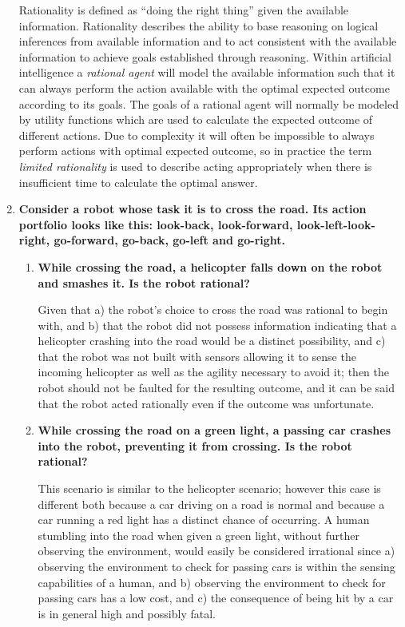 \begin{enumerate}
Rationality is defined as ``doing the right thing'' given the available information. Rationality describes the ability to base reasoning on logical inferences from available information and to act consistent with the available information to achieve goals established through reasoning. Within artificial intelligence a \textit{rational agent} will model the available information such that it can always perform the action available with the optimal expected outcome according to its goals. The goals of a rational agent will normally be modeled by utility functions which are used to calculate the expected outcome of different actions. Due to complexity it will often be impossible to always perform actions with optimal expected outcome, so in practice the term \textit{limited rationality} is used to describe acting appropriately when there is insufficient time to calculate the optimal answer.

\item \textbf{Consider a robot whose task it is to cross the road. Its action portfolio looks like this: look-back, look-forward, look-left-look-right, go-forward, go-back, go-left and go-right.}

\begin{enumerate}

\item \textbf{While crossing the road, a helicopter falls down on the robot and smashes it. Is the robot rational?}

Given that a) the robot's choice to cross the road was rational to begin with, and b) that the robot did not possess information indicating that a helicopter crashing into the road would be a distinct possibility, and c) that the robot was not built with sensors allowing it to sense the incoming helicopter as well as the agility necessary to avoid it; then the robot should not be faulted for the resulting outcome, and it can be said that the robot acted rationally even if the outcome was unfortunate. 

\item \textbf{While crossing the road on a green light, a passing car crashes into the robot, preventing it from crossing. Is the robot rational?}

This scenario is similar to the helicopter scenario; however this case is different both because a car driving on a road is normal and because a car running a red light has a distinct chance of occurring. A human stumbling into the road when given a green light, without further observing the environment, would easily be considered irrational since a) observing the environment to check for passing cars is within the sensing capabilities of a human, and b) observing the environment to check for passing cars has a low cost, and c) the consequence of being hit by a car is in general high and possibly fatal.


\end{enumerate}
\end{enumerate}
